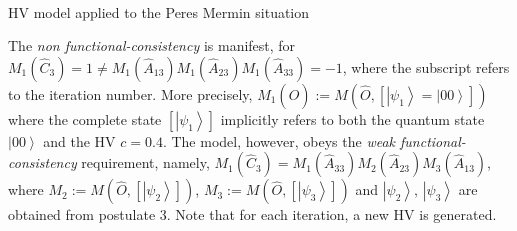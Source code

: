 \documentclass[doublecol,british]{epl2}
\theoremstyle{plain}
\theoremstyle{plain}
\theoremstyle{definition}
\theoremstyle{remark}
\theoremstyle{remark}
\theoremstyle{remark}
\theoremstyle{plain}
\theoremstyle{plain}
\theoremstyle{plain}
\theoremstyle{definition}
\theoremstyle{definition}
\begin{document}
\begin{table}
\begin{equation*}
\begin{array}{ccc}

\label{eq:toyModel}
\end{array}
\end{equation*}
\caption{HV model applied to the Peres Mermin situation}
\label{tbl:HVmodel}
\end{table}
The \emph{non functional-consistency} is
manifest, for $M_{1}(\hat{C}_{3})=1\neq
M_{1}(\hat{A}_{13})M_{1}(\hat{A}_{23})M_{1}(\hat{A}_{33})=-1$,
where the subscript refers to the iteration
number.  More precisely,
$M_{1}(\hat{O}):=M(\hat{O},\left[\left|\psi_{1}\right\rangle
=\left|00\right\rangle \right])$ where the
complete state $\left[\left|\psi_{1}\right\rangle
\right]$ implicitly refers to both the quantum
state $\left|00\right\rangle $ and the HV $c=0.4$.
The model, however, obeys the \emph{weak functional-consistency} requirement,
namely,
$M_{1}(\hat{C}_{3})=M_{1}
(\hat{A}_{33})M_{2}(\hat{A}_{23})M_{3}(\hat{A}_{13})$,
where
$M_{2}:=M(\hat{O},\left[\left|\psi_{2}\right\rangle
\right])$,
$M_{3}:=M(\hat{O},\left[\left|\psi_{3}\right\rangle
\right])$ and $\left|\psi_{2}\right\rangle
,\,\left|\psi_{3}\right\rangle $ are obtained from
postulate 3. Note that for each iteration, a new
HV is generated. 
\end{document}
